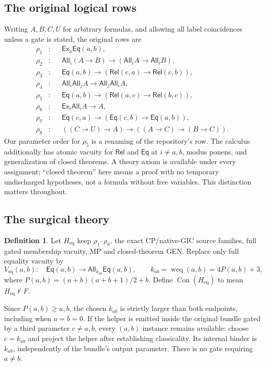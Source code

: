 \documentclass[11pt,letterpaper]{article}
\theoremstyle{definition}\newtheorem{definition}[theorem]{Definition}
\theoremstyle{remark}\newtheorem{remark}[theorem]{Remark}
\newcommand{\Rel}{\mathsf{Rel}}
\newcommand{\Eq}{\mathsf{Eq}}
\newcommand{\All}{\mathsf{All}}
\newcommand{\Ex}{\mathsf{Ex}}
\newcommand{\Con}{\operatorname{Con}}
\newcommand{\weq}{\operatorname{weq}}
\newcommand{\To}{\rightarrow}
\newcommand{\Hh}{H_{\mathrm{eq}}}
\begin{document}
\subsection{The original logical rows}
Writing $A,B,C,U$ for arbitrary formulas, and allowing all label coincidences unless a gate is stated, the original rows are
\begin{align*}
\rho_1&:&&\Ex_a\Eq(a,b),\\
\rho_2&:&&\All_i(A\To B)\To(\All_i A\To\All_i B),\\
\rho_3&:&&\Eq(a,b)\To(\Rel(c,a)\To\Rel(c,b)),\\
\rho_4&:&&\All_i\All_j A\To\All_j\All_i A,\\
\rho_5&:&&\Eq(a,b)\To(\Rel(a,c)\To\Rel(b,c)),\\
\rho_6&:&&\Ex_i\All_i A\To A,\\
\rho_7&:&&\Eq(c,a)\To(\Eq(c,b)\To\Eq(a,b)),\\
\rho_8&:&&((C\To U)\To A)\To((A\To C)\To(B\To C)).
\end{align*}
Our parameter order for $\rho_5$ is a renaming of the repository's row. The calculus additionally has atomic vacuity for $\Rel$ and $\Eq$ at $i\ne a,b$, modus ponens, and generalization of closed theorems. A theory axiom is available under every assignment; ``closed theorem'' here means a proof with no temporary undischarged hypotheses, not a formula without free variables. This distinction matters throughout.

\subsection{The surgical theory}
\begin{definition}
Let $\Hh$ keep $\rho_1$--$\rho_8$, the exact CP/native-GIC source families, full gated membership vacuity, MP and closed-theorem GEN. Replace only full equality vacuity by
\begin{equation}\label{eq:helper}
 V_{\mathrm{eq}}(a,b):\quad
 \Eq(a,b)\To\All_{k_{ab}}\Eq(a,b),\qquad
 k_{ab}=\weq(a,b)=4P(a,b)+3,
\end{equation}
where $P(a,b)=(a+b)(a+b+1)/2+b$. Define $\Con(\Hh)$ to mean $\Hh\nvdash F$.
\end{definition}
Since $P(a,b)\ge a,b$, the chosen $k_{ab}$ is strictly larger than both endpoints, including when $a=b=0$. If the helper is emitted inside the original bundle gated by a third parameter $c\ne a,b$, every $(a,b)$ instance remains available: choose $c=k_{ab}$ and project the helper after establishing classicality. Its internal binder is $k_{ab}$, independently of the bundle's output parameter. There is no gate requiring $a\ne b$.
\end{document}
